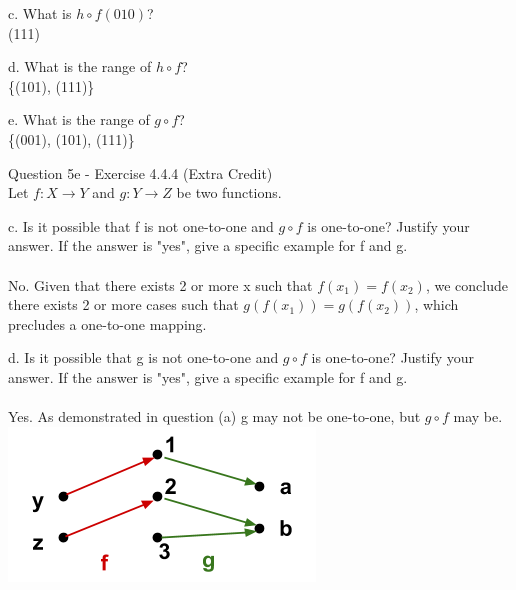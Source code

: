 \documentclass[OPONE]{example}
\begin{document}
\begin{list}{}{}
	
	\item{c.}
	What is $h \circ f(010)$?	\\
	(111)
	
	\item{d.}
	What is the range of $h \circ f$? \\
	\{(101), (111)\}
	
	\item{e.}
	What is the range of $g \circ f$? \\
	\{(001), (101), (111)\}
	
\end{list}

\noindent Question 5e - Exercise 4.4.4 (Extra Credit) \\

Let $f: X \rightarrow Y$ and $g: Y \rightarrow Z$ be two functions.

\begin{list}{}{}
	
	\item{c.}
	Is it possible that f is not one-to-one and $g \circ f$ is one-to-one? Justify your answer. If the answer is "yes", give a specific example for f and g.	\\
	\\
	No. Given that there exists 2 or more x such that $f(x_{1}) = f(x_{2})$, we conclude there exists 2 or more cases such that $g(f(x_{1})) = g(f(x_{2}))$, which precludes a one-to-one mapping.
	
	\item{d.}
	Is it possible that g is not one-to-one and $g \circ f$ is one-to-one? Justify your answer. If the answer is "yes", give a specific example for f and g.	\\
	\\
	Yes. As demonstrated in question (a) g may not be one-to-one, but $g \circ f$ may be. \\
	
	\includegraphics{4.4.4.d}
	
	
\end{list}



\end{document}
